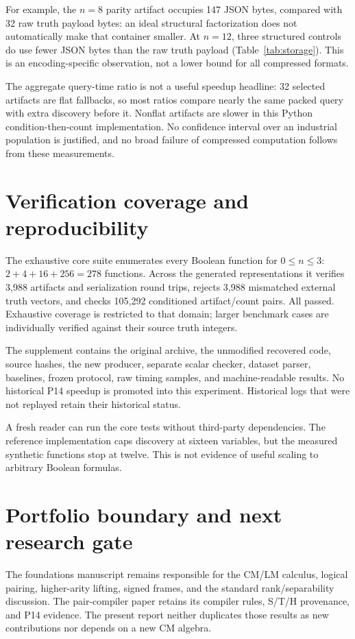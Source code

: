 \documentclass[11pt]{article}
\theoremstyle{definition}\newtheorem{definition}[theorem]{Definition}
\theoremstyle{remark}\newtheorem{remark}[theorem]{Remark}
\begin{document}
For example, the $n=8$ parity artifact occupies 147 JSON bytes, compared with 32 raw truth payload bytes: an ideal structural factorization does not automatically make that container smaller. At $n=12$, three structured controls do use fewer JSON bytes than the raw truth payload (Table~\ref{tab:storage}). This is an encoding-specific observation, not a lower bound for all compressed formats.

The aggregate query-time ratio is not a useful speedup headline: 32 selected artifacts are flat fallbacks, so most ratios compare nearly the same packed query with extra discovery before it. Nonflat artifacts are slower in this Python condition-then-count implementation. No confidence interval over an industrial population is justified, and no broad failure of compressed computation follows from these measurements.

\section{Verification coverage and reproducibility}
The exhaustive core suite enumerates every Boolean function for $0\le n\le3$: $2+4+16+256=278$ functions. Across the generated representations it verifies 3,988 artifacts and serialization round trips, rejects 3,988 mismatched external truth vectors, and checks 105,292 conditioned artifact/count pairs. All passed. Exhaustive coverage is restricted to that domain; larger benchmark cases are individually verified against their source truth integers.

The supplement contains the original archive, the unmodified recovered code, source hashes, the new producer, separate scalar checker, dataset parser, baselines, frozen protocol, raw timing samples, and machine-readable results. No historical P14 speedup is promoted into this experiment. Historical logs that were not replayed retain their historical status.

A fresh reader can run the core tests without third-party dependencies. The reference implementation caps discovery at sixteen variables, but the measured synthetic functions stop at twelve. This is not evidence of useful scaling to arbitrary Boolean formulas.

\section{Portfolio boundary and next research gate}
The foundations manuscript remains responsible for the CM/LM calculus, logical pairing, higher-arity lifting, signed frames, and the standard rank/separability discussion\cite{foundations}. The pair-compiler paper retains its compiler rules, S/T/H provenance, and P14 evidence. The present report neither duplicates those results as new contributions nor depends on a new CM algebra.
\end{document}
